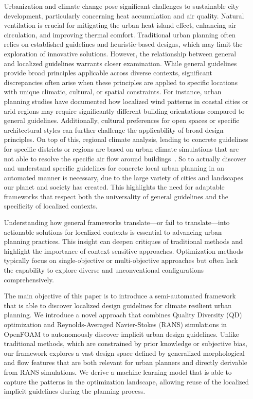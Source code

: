 \documentclass[times,final]{elsarticle}
\begin{document}
Urbanization and climate change pose significant challenges to sustainable city development, particularly concerning heat accumulation and air quality. Natural ventilation is crucial for mitigating the urban heat island effect, enhancing air circulation, and improving thermal comfort. Traditional urban planning often relies on established guidelines and heuristic-based designs, which may limit the exploration of innovative solutions. However, the relationship between general and localized guidelines warrants closer examination. While general guidelines provide broad principles applicable across diverse contexts, significant discrepancies often arise when these principles are applied to specific locations with unique climatic, cultural, or spatial constraints. For instance, urban planning studies have documented how localized wind patterns in coastal cities or arid regions may require significantly different building orientations compared to general guidelines. Additionally, cultural preferences for open spaces or specific architectural styles can further challenge the applicability of broad design principles. 
On top of this, regional climate analysis, leading to concrete guidelines for specific districts or regions are based on urban climate simulations that are not able to resolve the specific air flow around buildings~\cite{Kruse2018lanuv}. 
So to actually discover and understand specific guidelines for concrete local urban planning in an automated manner is necessary, due to the large variety of cities and landscapes our planet and society has created.
This highlights the need for adaptable frameworks that respect both the universality of general guidelines and the specificity of localized contexts. 

Understanding how general frameworks translate—or fail to translate—into actionable solutions for localized contexts is essential to advancing urban planning practices. This insight can deepen critiques of traditional methods and highlight the importance of context-sensitive approaches. Optimization methods typically focus on single-objective or multi-objective approaches but often lack the capability to explore diverse and unconventional configurations comprehensively.

The main objective of this paper is to introduce a semi-automated framework that is able to discover localized design guidelines for climate resilient urban planning. We introduce a novel approach that combines Quality Diversity (QD) optimization and Reynolds-Averaged Navier-Stokes (RANS) simulations in OpenFOAM to autonomously discover implicit urban design guidelines. Unlike traditional methods, which are constrained by prior knowledge or subjective bias, our framework explores a vast design space defined by generalized morphological and flow features that are both relevant for urban planners and directly derivable from RANS simulations. We derive a machine learning model that is able to capture the patterns in the optimization landscape, allowing reuse of the localized implicit guidelines during the planning process.
\end{document}
